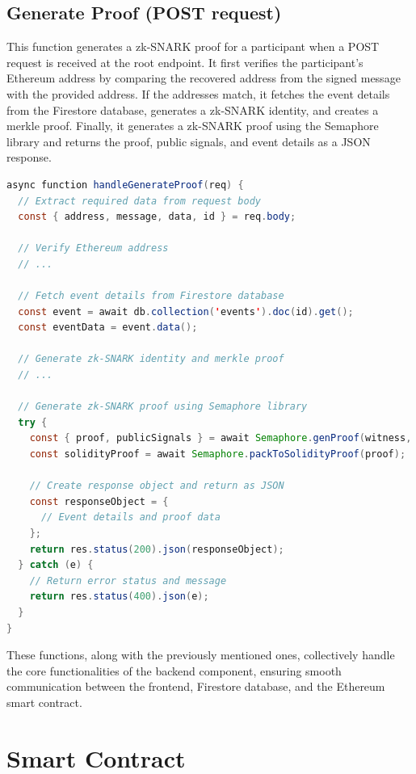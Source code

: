 \subsection{Generate Proof (POST request)}
This function generates a zk-SNARK proof for a participant when a POST request is received at the root endpoint. It first verifies the participant's Ethereum address by comparing the recovered address from the signed message with the provided address. If the addresses match, it fetches the event details from the Firestore database, generates a zk-SNARK identity, and creates a merkle proof. Finally, it generates a zk-SNARK proof using the Semaphore library and returns the proof, public signals, and event details as a JSON response.

\begin{lstlisting}[language=Java, name={Generate Proof Function}, label={sc:generateProof}]
async function handleGenerateProof(req) {
  // Extract required data from request body
  const { address, message, data, id } = req.body;

  // Verify Ethereum address
  // ...

  // Fetch event details from Firestore database
  const event = await db.collection('events').doc(id).get();
  const eventData = event.data();

  // Generate zk-SNARK identity and merkle proof
  // ...

  // Generate zk-SNARK proof using Semaphore library
  try {
    const { proof, publicSignals } = await Semaphore.genProof(witness, semaphoreWasmPath, semaphoreZkeyPath);
    const solidityProof = await Semaphore.packToSolidityProof(proof);

    // Create response object and return as JSON
    const responseObject = {
      // Event details and proof data
    };
    return res.status(200).json(responseObject);
  } catch (e) {
    // Return error status and message
    return res.status(400).json(e);
  }
}
\end{lstlisting}

These functions, along with the previously mentioned ones, collectively handle the core functionalities of the backend component, ensuring smooth communication between the frontend, Firestore database, and the Ethereum smart contract.



\section{Smart Contract}

